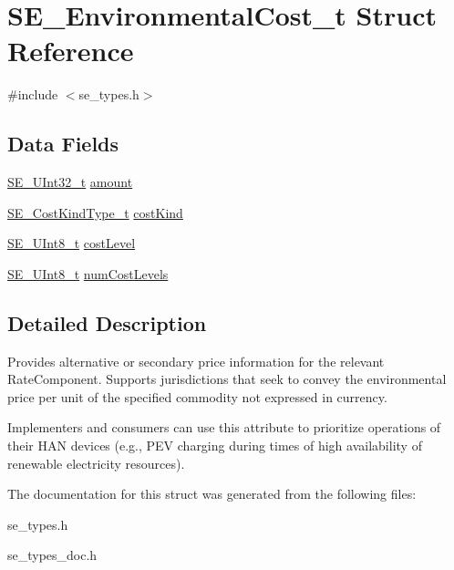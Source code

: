 \hypertarget{structSE__EnvironmentalCost__t}{}\section{S\+E\+\_\+\+Environmental\+Cost\+\_\+t Struct Reference}
\label{structSE__EnvironmentalCost__t}


{\ttfamily \#include $<$se\+\_\+types.\+h$>$}

\subsection*{Data Fields}
\begin{DoxyCompactItemize}
\item 
\hyperlink{group__UInt32_ga70bd4ecda3c0c85d20779d685a270cdb}{S\+E\+\_\+\+U\+Int32\+\_\+t} \hyperlink{group__EnvironmentalCost_ga9fb61a220a4b7b3f677b34a19ddec1d2}{amount}
\item 
\hyperlink{group__CostKindType_ga7a0a832ce8a138d7ba008379e83b718b}{S\+E\+\_\+\+Cost\+Kind\+Type\+\_\+t} \hyperlink{group__EnvironmentalCost_ga1aeeee701b58bf3a63ad13c43e7a75cd}{cost\+Kind}
\item 
\hyperlink{group__UInt8_gaf7c365a1acfe204e3a67c16ed44572f5}{S\+E\+\_\+\+U\+Int8\+\_\+t} \hyperlink{group__EnvironmentalCost_ga886bd3034acbc87051b648e6b2242453}{cost\+Level}
\item 
\hyperlink{group__UInt8_gaf7c365a1acfe204e3a67c16ed44572f5}{S\+E\+\_\+\+U\+Int8\+\_\+t} \hyperlink{group__EnvironmentalCost_ga47696c1d43b551dfb6cc492460500ea1}{num\+Cost\+Levels}
\end{DoxyCompactItemize}


\subsection{Detailed Description}
Provides alternative or secondary price information for the relevant Rate\+Component. Supports jurisdictions that seek to convey the environmental price per unit of the specified commodity not expressed in currency.

Implementers and consumers can use this attribute to prioritize operations of their H\+AN devices (e.\+g., P\+EV charging during times of high availability of renewable electricity resources). 

The documentation for this struct was generated from the following files\+:\begin{DoxyCompactItemize}
\item 
se\+\_\+types.\+h\item 
se\+\_\+types\+\_\+doc.\+h\end{DoxyCompactItemize}
